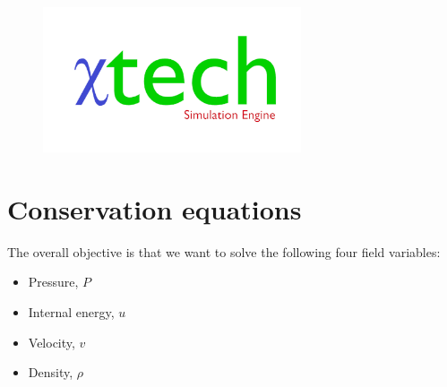 \documentclass[11pt,letterpaper,titlepage]{article}
\begin{document}
\begin{titlepage}
\begin{center}
\begin{minipage}[c]{0.45\textwidth}
\begin{figure}[H]
				\includegraphics[width=3in]{Logo2_Medium.png}
			\end{figure}
		\end{minipage}
	\end{center}
	\vspace{2cm}
\end{titlepage}


\pagestyle{fancy}
\cfoot{}
\lfoot{\truncate{14cm}{\NSCDOCTITLE}}
\rhead{}
\chead{\currentname}
\lhead{}
\renewcommand{\footrulewidth}{0.4pt}
\tableofcontents
{}

\listoffigures
\listoftables
{}


\newpage
{}
\section{Conservation equations}
The overall objective is that we want to solve the following four field variables:
\begin{itemize}
\item Pressure, $P$
\item Internal energy, $u$
\item Velocity, $v$
\item Density, $\rho$
\end{itemize}
\end{document}
